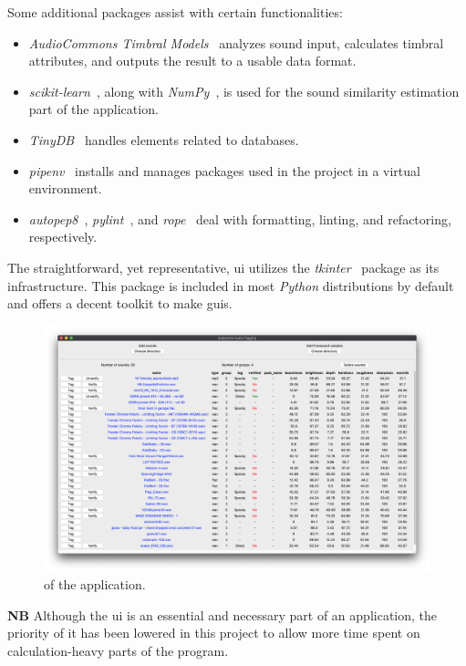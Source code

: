 Some additional packages assist with certain functionalities:
\begin{itemize}
    \item \emph{AudioCommons Timbral Models}~\cite{timbral_models} analyzes sound input, calculates timbral attributes, and outputs the result to a usable data format.
    \item \emph{scikit-learn}~\cite{scikit-learn}, along with \emph{NumPy}~\cite{numpy}, is used for the sound similarity estimation part of the application.
    \item \emph{TinyDB}~\cite{tinydb} handles elements related to databases.
    \item \emph{pipenv}~\cite{pipenv} installs and manages packages used in the project in a virtual environment.
    \item \emph{autopep8}~\cite{autopep8}, \emph{pylint}~\cite{pylint}, and \emph{rope}~\cite{rope} deal with formatting, linting, and refactoring, respectively.
\end{itemize}
The straightforward, yet representative, \gls{ui} utilizes the \emph{tkinter}~\cite{tkinter} package as its infrastructure. This package is included in most \emph{Python} distributions by default and offers a decent toolkit to make \glspl{gui}.
\begin{figure}[ht]
    \includegraphics[width=\textwidth]{figures/app/ui}
    \caption{ of the application.}\label{fig:app/ui}
\end{figure}
\begin{mdframed}[style=info]
    \textbf{NB} Although the \gls{ui} is an essential and necessary part of an application, the priority of it has been lowered in this project to allow more time spent on calculation-heavy parts of the program.
\end{mdframed}

